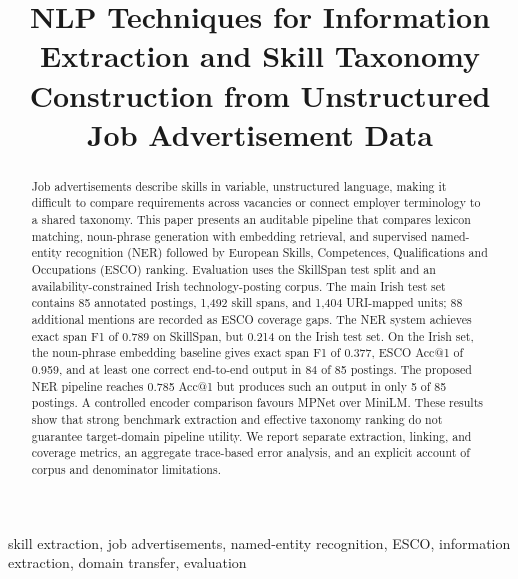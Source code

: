 \documentclass[conference]{IEEEtran}
\begin{document}
\title{NLP Techniques for Information Extraction and
Skill Taxonomy Construction from Unstructured
Job Advertisement Data}

\author{
}

\maketitle

\begin{abstract}
Job advertisements describe skills in variable, unstructured language, making it difficult to compare requirements across vacancies or connect employer terminology to a shared taxonomy. This paper presents an auditable pipeline that compares lexicon matching, noun-phrase generation with embedding retrieval, and supervised named-entity recognition (NER) followed by European Skills, Competences, Qualifications and Occupations (ESCO) ranking. Evaluation uses the SkillSpan test split and an availability-constrained Irish technology-posting corpus. The main Irish test set contains 85 annotated postings, 1,492 skill spans, and 1,404 URI-mapped units; 88 additional mentions are recorded as ESCO coverage gaps. The NER system achieves exact span F1 of 0.789 on SkillSpan, but 0.214 on the Irish test set. On the Irish set, the noun-phrase embedding baseline gives exact span F1 of 0.377, ESCO Acc@1 of 0.959, and at least one correct end-to-end output in 84 of 85 postings. The proposed NER pipeline reaches 0.785 Acc@1 but produces such an output in only 5 of 85 postings. A controlled encoder comparison favours MPNet over MiniLM. These results show that strong benchmark extraction and effective taxonomy ranking do not guarantee target-domain pipeline utility. We report separate extraction, linking, and coverage metrics, an aggregate trace-based error analysis, and an explicit account of corpus and denominator limitations.
\end{abstract}

\begin{IEEEkeywords}
skill extraction, job advertisements, named-entity recognition, ESCO, information extraction, domain transfer, evaluation
\end{IEEEkeywords}
\end{document}
